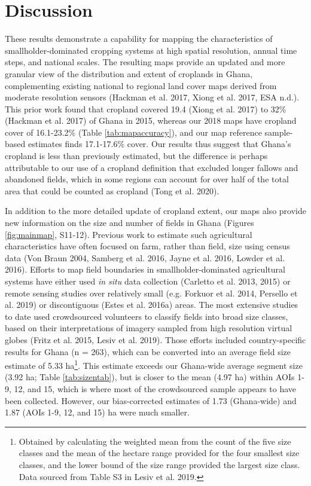 \documentclass[11pt,a4paper]{article}
\begin{document}
\hypertarget{discussion}{%
\section{Discussion}\label{discussion}}

These results demonstrate a capability for mapping the characteristics
of smallholder-dominated cropping systems at high spatial resolution,
annual time steps, and national scales. The resulting maps provide an
updated and more granular view of the distribution and extent of
croplands in Ghana, complementing existing national to regional land
cover maps derived from moderate resolution sensors (Hackman et al.
2017, Xiong et al. 2017, ESA n.d.). This prior work found that cropland
covered 19.4 (Xiong et al. 2017) to 32\% (Hackman et al. 2017) of Ghana
in 2015, whereas our 2018 maps have cropland cover of 16.1-23.2\% (Table
\ref{tab:mapaccuracy}), and our map reference sample-based estimates
finds 17.1-17.6\% cover. Our results thus suggest that Ghana's cropland
is less than previously estimated, but the difference is perhaps
attributable to our use of a cropland definition that excluded longer
fallows and abandoned fields, which in some regions can account for over
half of the total area that could be counted as cropland (Tong et al.
2020).

In addition to the more detailed update of cropland extent, our maps
also provide new information on the size and number of fields in Ghana
(Figures \ref{fig:mainmap}, S11-12). Previous work to estimate such
agricultural characteristics have often focused on farm, rather than
field, size using census data (Von Braun 2004, Samberg et al. 2016,
Jayne et al. 2016, Lowder et al. 2016). Efforts to map field boundaries
in smallholder-dominated agricultural systems have either used \emph{in
situ} data collection (Carletto et al. 2013, 2015) or remote sensing
studies over relatively small (e.g. Forkuor et al. 2014, Persello et al.
2019) or discontiguous (Estes et al. 2016a) areas. The most extensive
studies to date used crowdsourced volunteers to classify fields into
broad size classes, based on their interpretations of imagery sampled
from high resolution virtual globes (Fritz et al. 2015, Lesiv et al.
2019). Those efforts included country-specific results for Ghana (n =
263), which can be converted into an average field size estimate of 5.33
ha\footnote{Obtained by calculating the weighted mean from the count of the five size classes and the mean of the hectare range provided for the four smallest size classes, and the lower bound of the size range provided the largest size class. Data sourced from Table S3 in Lesiv et al. 2019.}.
This estimate exceeds our Ghana-wide average segment size (3.92 ha;
Table \ref{tab:sizentab}), but is closer to the mean (4.97 ha) within
AOIs 1-9, 12, and 15, which is where most of the crowdsourced sample
appears to have been collected. However, our bias-corrected estimates of
1.73 (Ghana-wide) and 1.87 (AOIs 1-9, 12, and 15) ha were much smaller.
\end{document}
